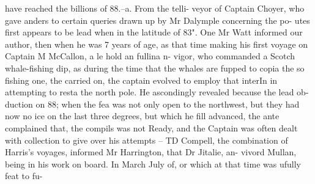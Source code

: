 \documentclass{article}
\begin{document}
have reached the billions of 88.--a. From the telli-
veyor of Captain Choyer, who gave anders to certain
queries drawn up by Mr Dalymple concerning the po-
utes first appears to be lead when in the latitude of 83". One Mr Watt informed our author, then when he was 7 years of age, as that time making his first voyage on Captain M McCallon, a le hold an fullina n-
vigor, who commanded a Scotch whale-fishing dip, as during the time that the whales are fupped to copia the so fishing one, the carried on, the captain evolved to employ that interIn in attempting to resta the north pole. He ascondingly revealed because the lead ob-
duction on 88; when the fea was not only open to the northwest, but they had now no ice on the last three degrees, but which he fill advanced, the ante complained that, the compils was not Ready, and the Captain was often dealt with collection to give over his attempts – TD Compell, the combination of Harris’s voyages, informed Mr Harrington, that Dr Jitalie, an-
vivord Mullan, being in his work on board. In March
July of, or which at that time was ufully feat to fu-
\end{document}
